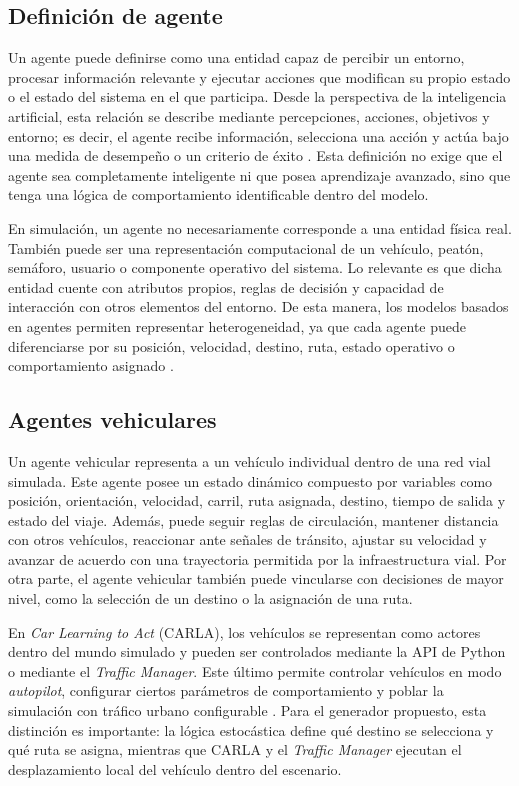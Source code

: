 \subsection{Definición de agente}
\label{subsubsec:definicion_agente}

Un agente puede definirse como una entidad capaz de percibir un entorno, procesar información relevante y ejecutar acciones que modifican su propio estado o el estado del sistema en el que participa. Desde la perspectiva de la inteligencia artificial, esta relación se describe mediante percepciones, acciones, objetivos y entorno; es decir, el agente recibe información, selecciona una acción y actúa bajo una medida de desempeño o un criterio de éxito \cite{russell1995ai}. Esta definición no exige que el agente sea completamente inteligente ni que posea aprendizaje avanzado, sino que tenga una lógica de comportamiento identificable dentro del modelo.

En simulación, un agente no necesariamente corresponde a una entidad física real. También puede ser una representación computacional de un vehículo, peatón, semáforo, usuario o componente operativo del sistema. Lo relevante es que dicha entidad cuente con atributos propios, reglas de decisión y capacidad de interacción con otros elementos del entorno. De esta manera, los modelos basados en agentes permiten representar heterogeneidad, ya que cada agente puede diferenciarse por su posición, velocidad, destino, ruta, estado operativo o comportamiento asignado \cite{macal2010abms,wooldridge2009multiagent}.

\subsection{Agentes vehiculares}
\label{subsubsec:agentes_vehiculares}

Un agente vehicular representa a un vehículo individual dentro de una red vial simulada. Este agente posee un estado dinámico compuesto por variables como posición, orientación, velocidad, carril, ruta asignada, destino, tiempo de salida y estado del viaje. Además, puede seguir reglas de circulación, mantener distancia con otros vehículos, reaccionar ante señales de tránsito, ajustar su velocidad y avanzar de acuerdo con una trayectoria permitida por la infraestructura vial. Por otra parte, el agente vehicular también puede vincularse con decisiones de mayor nivel, como la selección de un destino o la asignación de una ruta.

En \textit{Car Learning to Act} (CARLA), los vehículos se representan como actores dentro del mundo simulado y pueden ser controlados mediante la API de Python o mediante el \textit{Traffic Manager}. Este último permite controlar vehículos en modo \textit{autopilot}, configurar ciertos parámetros de comportamiento y poblar la simulación con tráfico urbano configurable \cite{dosovitskiy2017carla,carla_traffic_manager_docs}. Para el generador propuesto, esta distinción es importante: la lógica estocástica define qué destino se selecciona y qué ruta se asigna, mientras que CARLA y el \textit{Traffic Manager} ejecutan el desplazamiento local del vehículo dentro del escenario.

